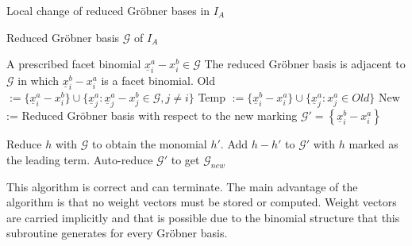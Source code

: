 \begin{algorithm}
\caption{Local change of reduced Gröbner bases in $I_A$ \cite{tigers}}
\label{alg:flip}
\begin{algorithmic}[1]

\Require
Reduced Gröbner basis $ \mathcal{G} $ of $I_A$

    A prescribed facet binomial $ \underline{x}^{a}_{i} - x^{b}_{i} \in \mathcal{G} $
\Ensure The reduced Gröbner basis is adjacent to $\mathcal{G}$ in which $ \underline{x}^{b}_{i} - x^{a}_{i} $ is a facet binomial.
\State Old 
$:= \lbrace \underline{x}^{a}_{i} - x^{b}_{i} \rbrace \cup
 \lbrace \underline{x}^{a}_{j} : \underline{x}^{a}_{j} - x^{b}_{j} \in \mathcal{G},
 j \neq i \rbrace $ 
 \State Temp $:= \lbrace \underline{x}^{b}_{i} - x^{a}_{i} \rbrace \cup 
 \lbrace \underline{x}^{a}_{j} : x^{a}_{j} \in Old  \rbrace $
 \State New := Reduced Gröbner basis with respect to the new marking 
 \State $\mathcal{G}' = \left\lbrace \underline{x}^{b}_{i} - x^{a}_{i} \right\rbrace  $
 
 \State Reduce $h$ with $\mathcal{G}$ to obtain the monomial $h'$.
 \State Add $h-h'$ to $\mathcal{G}'$ with $h$ marked as the leading term.
 \EndFor
 \State Auto-reduce $\mathcal{G}'$ to get $\mathcal{G}_{new}$

\end{algorithmic}
\end{algorithm}

This algorithm is correct and can terminate.\cite{tigers}
The main advantage of the algorithm is that no weight vectors must be stored or computed.
Weight vectors are carried implicitly and that is possible due to the binomial structure that this subroutine generates for every Gröbner basis.

